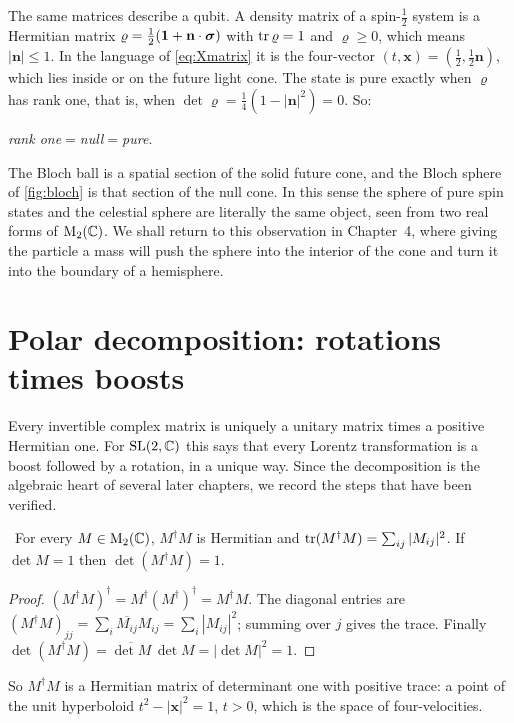 The same matrices describe a qubit. A density matrix of a spin-$\tfrac12$ system is a Hermitian matrix $\varrho=\tfrac12(\mathbf 1+\mathbf n\cdot\boldsymbol{\sigma})$ with $\operatorname{tr}\varrho=1$ and $\varrho\ge0$, which means $|\mathbf n|\le1$. In the language of \eqref{eq:Xmatrix} it is the four-vector $(t,\mathbf x)=(\tfrac12,\tfrac12\mathbf n)$, which lies inside or on the future light cone. The state is pure exactly when $\varrho$ has rank one, that is, when $\det\varrho=\tfrac14(1-|\mathbf n|^2)=0$. So:
\begin{center}
\emph{rank one}\quad$=$\quad\emph{null}\quad$=$\quad\emph{pure}.
\end{center}
The Bloch ball is a spatial section of the solid future cone, and the Bloch sphere of \cref{fig:bloch} is that section of the null cone. In this sense the sphere of pure spin states and the celestial sphere are literally the same object, seen from two real forms of $\mathrm{M}_2(\mathbb{C})$. We shall return to this observation in Chapter~4, where giving the particle a mass will push the sphere into the interior of the cone and turn it into the boundary of a hemisphere.

\section{Polar decomposition: rotations times boosts}

Every invertible complex matrix is uniquely a unitary matrix times a positive Hermitian one. For $\mathrm{SL}(2,\mathbb{C})$ this says that every Lorentz transformation is a boost followed by a rotation, in a unique way. Since the decomposition is the algebraic heart of several later chapters, we record the steps that have been verified.

\begin{proposition}\label{prop:gram}\ver\
For every $M\in\mathrm{M}_2(\mathbb{C})$, $M^\dagger M$ is Hermitian and $\operatorname{tr}(M^\dagger M)=\sum_{ij}|M_{ij}|^2$. If $\det M=1$ then $\det(M^\dagger M)=1$.
\end{proposition}
\begin{proof}
$(M^\dagger M)^\dagger=M^\dagger(M^\dagger)^\dagger=M^\dagger M$. The diagonal entries are $(M^\dagger M)_{jj}=\sum_i\overline{M_{ij}}M_{ij}=\sum_i|M_{ij}|^2$; summing over $j$ gives the trace. Finally $\det(M^\dagger M)=\overline{\det M}\,\det M=|\det M|^2=1$.
\end{proof}


So $M^\dagger M$ is a Hermitian matrix of determinant one with positive trace: a point of the unit hyperboloid $t^2-|\mathbf x|^2=1$, $t>0$, which is the space of four-velocities.


